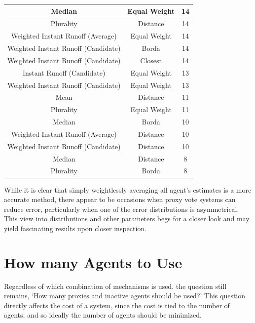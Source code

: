 \begin{table}[htbp]
\begin{tabular}{|c|c|c|}
        \hline
        Median                              & Equal Weight        & 14    \\
        \hline
        Plurality                           & Distance            & 14    \\
        \hline
        Weighted Instant Runoff (Average)   & Equal Weight        & 14    \\
        \hline
        Weighted Instant Runoff (Candidate) & Borda               & 14    \\
        \hline
        Weighted Instant Runoff (Candidate) & Closest             & 14    \\
        \hline
        Instant Runoff (Candidate)          & Equal Weight        & 13    \\
        \hline
        Weighted Instant Runoff (Candidate) & Equal Weight        & 13    \\
        \hline
        Mean                                & Distance            & 11    \\
        \hline
        Plurality                           & Equal Weight        & 11    \\
        \hline
        Median                              & Borda               & 10    \\
        \hline
        Weighted Instant Runoff (Average)   & Distance            & 10    \\
        \hline
        Weighted Instant Runoff (Candidate) & Distance            & 10    \\
        \hline
        Median                              & Distance            & 8     \\
        \hline
        Plurality                           & Borda               & 8     \\
        \hline
    \end{tabular}
\end{table}

While it is clear that simply weightlessly averaging all agent's estimates is a more
accurate method, there appear to be occasions when proxy vote systems can reduce
error, particularly when one of the error distributions is asymmetrical.
This view into distributions and other parameters begs for a closer look and may yield
fascinating results upon closer inspection.


\section{How many Agents to Use}\label{sec:how-many-agents}
Regardless of which combination of mechanisms is used, the question still remains,
`How many proxies and inactive agents should be used?'
This question directly affects the cost of a system, since the cost is tied to the
number of agents, and so ideally the number of agents should be minimized.

